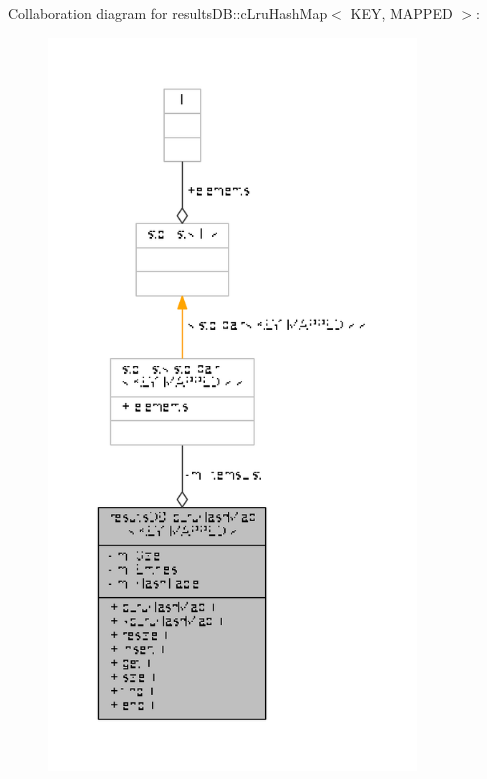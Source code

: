 Collaboration diagram for results\-D\-B\-:\-:c\-Lru\-Hash\-Map$<$ K\-E\-Y, M\-A\-P\-P\-E\-D $>$\-:
\nopagebreak
\begin{figure}[H]
\begin{center}
\leavevmode
\includegraphics[height=550pt]{classresultsDB_1_1cLruHashMap__coll__graph}
\end{center}
\end{figure}
